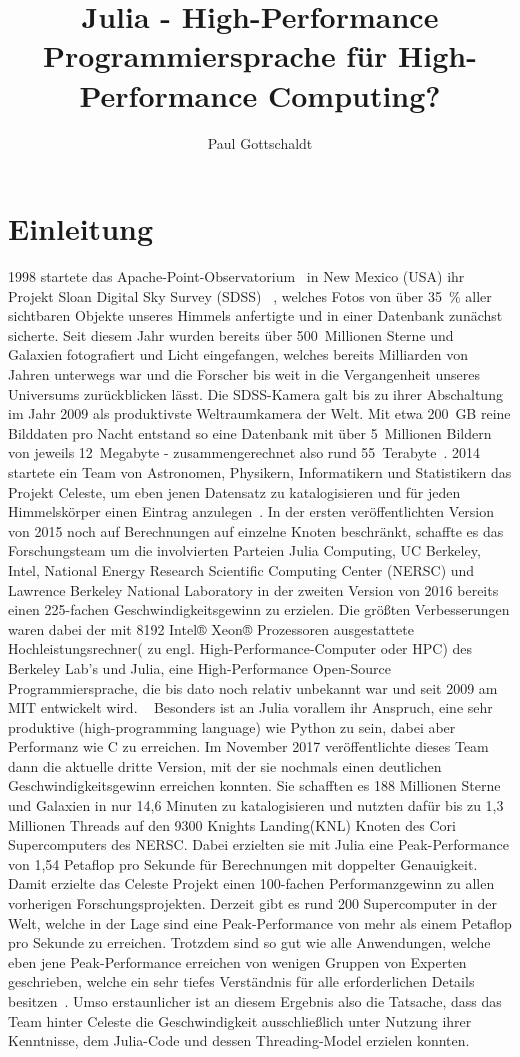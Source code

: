 \documentclass[proseminar,german,utf8]{zihpub}
\author{Paul Gottschaldt}
\title{Julia - High-Performance Programmiersprache für High-Performance Computing?}
\begin{document}
\section {Einleitung}
1998 startete das Apache-Point-Observatorium~\cite{APOWiki} in New Mexico (USA) ihr Projekt Sloan Digital Sky Survey (SDSS)~\cite{SDSSWiki} \cite{SDSSIII}, welches Fotos von über 35~\% aller sichtbaren Objekte unseres Himmels anfertigte und in einer Datenbank zunächst sicherte. Seit diesem Jahr wurden bereits über 500~Millionen Sterne und Galaxien fotografiert und Licht eingefangen, welches bereits Milliarden von Jahren unterwegs war und die Forscher bis weit in die Vergangenheit unseres Universums zurückblicken lässt. Die SDSS-Kamera galt bis zu ihrer Abschaltung im Jahr 2009 als produktivste Weltraumkamera der Welt. Mit etwa 200~GB reine Bilddaten pro Nacht entstand so eine Datenbank mit über 5~Millionen Bildern von jeweils 12~Megabyte - zusammengerechnet also rund 55~Terabyte~\cite{CelesteV2}. 2014 startete ein Team von Astronomen, Physikern, Informatikern und Statistikern das Projekt Celeste, um eben jenen Datensatz zu katalogisieren und für jeden Himmelskörper einen Eintrag anzulegen~\cite{CelesteV3}. In der ersten veröffentlichten Version von 2015 noch auf Berechnungen auf einzelne Knoten beschränkt, schaffte es das Forschungsteam um die involvierten Parteien Julia Computing, UC Berkeley, Intel, National Energy Research Scientific Computing Center (NERSC) und Lawrence Berkeley National Laboratory in der zweiten Version von 2016 bereits einen 225-fachen Geschwindigkeitsgewinn zu erzielen. Die größten Verbesserungen waren dabei der mit 8192 Intel® Xeon® Prozessoren ausgestattete Hochleistungsrechner( zu engl. High-Performance-Computer oder HPC) des Berkeley Lab's und Julia, eine High-Performance Open-Source Programmiersprache, die bis dato noch relativ unbekannt war und seit 2009 am MIT entwickelt wird. ~\cite{CelesteHeise} \cite{CelesteVideo} Besonders ist an Julia vorallem ihr Anspruch, eine sehr produktive (high-programming language) wie Python zu sein, dabei aber Performanz wie C zu erreichen. Im November 2017 veröffentlichte dieses Team dann die aktuelle dritte Version, mit der sie nochmals einen deutlichen Geschwindigkeitsgewinn erreichen konnten. Sie schafften es 188 Millionen Sterne und Galaxien in nur 14,6 Minuten zu katalogisieren und nutzten dafür bis zu 1,3 Millionen Threads auf den 9300 Knights Landing(KNL) Knoten des Cori Supercomputers des NERSC. Dabei erzielten sie mit Julia eine Peak-Performance von 1,54 Petaflop pro Sekunde für Berechnungen mit doppelter Genauigkeit. Damit erzielte das Celeste Projekt einen 100-fachen Performanzgewinn zu allen vorherigen Forschungsprojekten. Derzeit gibt es rund 200 Supercomputer in der Welt, welche in der Lage sind eine Peak-Performance von mehr als einem Petaflop pro Sekunde zu erreichen. Trotzdem sind so gut wie alle Anwendungen, welche eben jene Peak-Performance erreichen von wenigen Gruppen von Experten geschrieben, welche ein sehr tiefes Verständnis für alle erforderlichen Details besitzen~\cite{CelesteNextPlatform}. Umso erstaunlicher ist an diesem Ergebnis also die Tatsache, dass das Team hinter Celeste die Geschwindigkeit ausschließlich unter Nutzung ihrer Kenntnisse, dem Julia-Code und dessen Threading-Model erzielen konnten.
\end{document}
